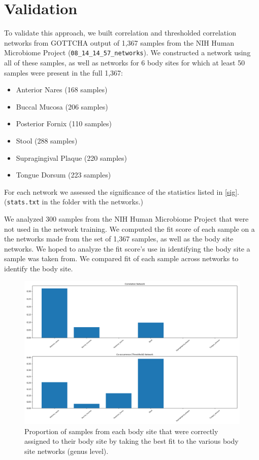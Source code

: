 \documentclass[10pt]{article}
\theoremstyle{definition}
\numberwithin{theorem}{section}
\numberwithin{definition}{section}
\numberwithin{lemma}{section}
\numberwithin{corollary}{section}
\numberwithin{clm}{section}
\numberwithin{rmk}{section}
\begin{document}
\section{Validation}

To validate this approach, we built correlation and thresholded correlation networks from GOTTCHA output of 1,367 samples from the NIH Human Microbiome Project (\verb|08_14_14_57_networks|). We constructed a network using all of these samples, as well as networks for 6 body sites for which at least 50 samples were present in the full 1,367:
\begin{itemize}
	\item Anterior Nares (168 samples) 
	\item Buccal Mucosa (206 samples)
	\item Posterior Fornix (110 samples)
	\item Stool (288 samples)
	\item Supragingival Plaque (220 samples)
	\item Tongue Dorsum (223 samples)
\end{itemize}
For each network we assessed the significance of the statistics listed in \cref{sig}. (\verb|stats.txt| in the folder with the networks.)

We analyzed 300 samples from the NIH Human Microbiome Project that were not used in the network training. We computed the fit score of each sample on a the networks made from the set of 1,367 samples, as well as the body site networks. We hoped to analyze the fit score's use in identifying the body site a sample was taken from. We compared fit of each sample across networks to identify the body site. 

\begin{figure}
	\begin{center}
	\includegraphics[scale = 0.4]{../correct_ids.png}
	\end{center}
	\caption{Proportion of samples from each body site that were correctly assigned to their body site by taking the best fit to the various body site networks (genus level).}
\end{figure}
\end{document}

